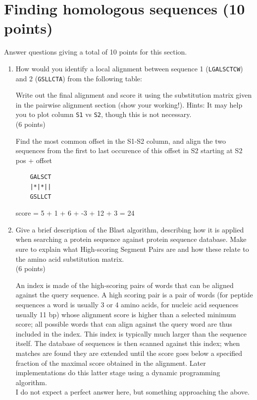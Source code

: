 \documentclass[11pt]{article}
\begin{document}
\section{Finding homologous sequences (10 points)}
Answer questions giving a total of 10 points for this section.
\begin{enumerate}
\item How would you identify a local alignment between sequence 1 (\verb|LGALSCTCW|) 
  and 2 (\verb|GSLLCTA|) from the following table:
\begin{figure}[H]
  
\end{figure}
Write out the final alignment and score it using the substitution matrix
given in the pairwise alignment section (show your working!).
{\small Hints: It may help you to plot column \texttt{S1} vs
  \texttt{S2}, though this is not necessary.
}\\
(6 points)

\begin{Notes}
  Find the most common offset in the S1-S2 column, and align the two sequences
  from the first to last occurence of this offset in S2 starting at S2 pos +
  offset\\
\begin{verbatim}
    GALSCT
    |*|*||
    GSLLCT
\end{verbatim}
  score = 5 + 1 + 6 + -3 + 12 + 3 = 24
\end{Notes}
\item Give a brief description of the Blast algorithm, describing how it is
  applied when searching a protein sequence against protein sequence
  database. Make sure to explain what High-scoring Segment Pairs are and how these
  relate to the amino acid substitution matrix.\\
(6 points)

\begin{Notes}
  An index is made of the high-scoring pairs of words that can be aligned
  against the query sequence. A high scoring pair is a pair of words (for
  peptide sequences a word is usually 3 or 4 amino acids, for nucleic acid
  sequences usually 11 bp) whose alignment score is higher than a selected
  minimum score; all possible words that can align against the query word are
  thus included in the index. This index is typically much larger than the sequence
  itself. The database of sequences is then scanned against this index; when
  matches are found they are extended until the score goes below a specified
  fraction of the maximal score obtained in the alignment. Later
  implementations do this latter stage using a dynamic programming
  algorithm.\\
  I do not expect a perfect answer here, but something approaching the above.
\end{Notes}


\end{enumerate}
\end{document}
